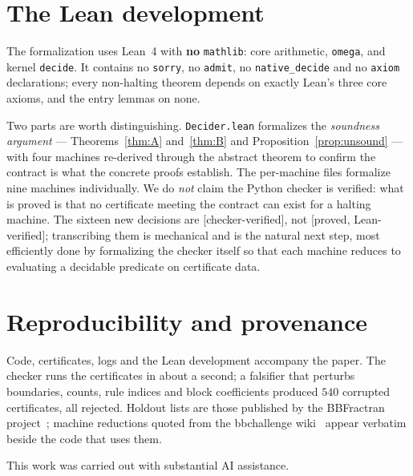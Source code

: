 \documentclass[11pt,a4paper]{article}
\theoremstyle{plain}
\theoremstyle{definition}
\newcommand{\Lean}{\textcolor{linkc}{\textsf{[proved, Lean-verified]}}}
\newcommand{\Chk}{\textcolor{linkc}{\textsf{[checker-verified]}}}
\begin{document}
\section{The Lean development}\label{sec:lean}

The formalization uses Lean~4 with \textbf{no} \texttt{mathlib}: core
arithmetic, \texttt{omega}, and kernel \texttt{decide}. It contains no
\texttt{sorry}, no \texttt{admit}, no \texttt{native\_decide} and no
\texttt{axiom} declarations; every non-halting theorem depends on exactly
Lean's three core axioms, and the entry lemmas on none.

Two parts are worth distinguishing. \texttt{Decider.lean} formalizes the
\emph{soundness argument} --- Theorems~\ref{thm:A} and~\ref{thm:B} and
Proposition~\ref{prop:unsound} --- with four machines re-derived through
the abstract theorem to confirm the contract is what the concrete proofs
establish. The per-machine files formalize nine machines individually. We
do \emph{not} claim the Python checker is verified: what is proved is
that no certificate meeting the contract can exist for a halting machine.
The sixteen new decisions are \Chk{}, not \Lean{}; transcribing them is
mechanical and is the natural next step, most efficiently done by
formalizing the checker itself so that each machine reduces to evaluating
a decidable predicate on certificate data.

\section{Reproducibility and provenance}\label{sec:repro}

Code, certificates, logs and the Lean development accompany the paper.
The checker runs the certificates in about a second; a falsifier that
perturbs boundaries, counts, rule indices and block coefficients produced
$540$ corrupted certificates, all rejected. Holdout lists are those
published by the BBFractran project~\cite{bbfractran}; machine reductions
quoted from the bbchallenge wiki~\cite{bbchallenge} appear verbatim beside
the code that uses them.

This work was carried out with substantial AI assistance.
\end{document}
